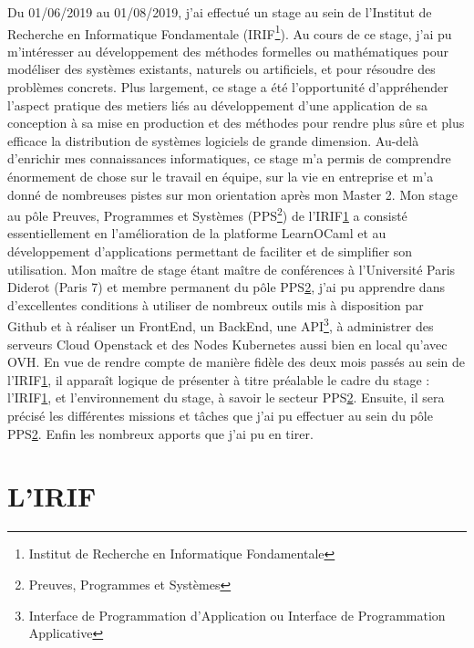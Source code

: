 \documentclass{article}
\begin{document}
Du 01/06/2019 au 01/08/2019, j’ai effectué un stage au sein de l'Institut de Recherche en Informatique Fondamentale (IRIF\footnote{\label{IRIF} Institut de Recherche en Informatique Fondamentale}). Au cours de ce stage, j’ai pu m’intéresser au développement des méthodes formelles ou mathématiques pour modéliser des systèmes existants, naturels ou artificiels, et pour résoudre des problèmes concrets.
Plus largement, ce stage a été l’opportunité d’appréhender l'aspect pratique des metiers liés au développement d'une application de sa conception à sa mise en production et des méthodes pour rendre plus sûre et plus efficace la distribution de systèmes logiciels de grande dimension.
\newline\newline
Au-delà d’enrichir mes connaissances informatiques, ce stage m’a permis de comprendre énormement de chose sur le travail en équipe, sur la vie en entreprise et m'a donné de nombreuses pistes sur mon orientation après mon Master 2.
Mon stage au pôle Preuves, Programmes et Systèmes (PPS\footnote{\label{PPS} Preuves, Programmes et Systèmes}) de l'IRIF\ref{IRIF} a consisté essentiellement en l'amélioration de la platforme LearnOCaml et au développement d'applications permettant de faciliter et de simplifier son utilisation.
Mon maître de stage étant maître de conférences à l'Université Paris Diderot (Paris 7) et membre permanent du pôle PPS\ref{PPS}, j’ai pu apprendre dans d’excellentes conditions à utiliser de nombreux outils mis à disposition par Github et à réaliser un FrontEnd, un BackEnd, une API\footnote{\label{API} Interface de Programmation d’Application ou Interface de Programmation Applicative}, à administrer des serveurs Cloud Openstack et des Nodes Kubernetes aussi bien en local qu'avec OVH.
\newline\newline
En vue de rendre compte de manière fidèle des deux mois passés au sein de l'IRIF\ref{IRIF}, il apparaît logique de présenter à titre préalable le cadre du stage : l'IRIF\ref{IRIF}, et l’environnement du stage, à savoir le secteur PPS\ref{PPS}. Ensuite, il sera précisé les différentes missions et tâches que j’ai pu effectuer au sein du pôle PPS\ref{PPS}. Enfin les nombreux apports que j’ai pu en tirer.

\newpage

\section{L'IRIF}
\end{document}

